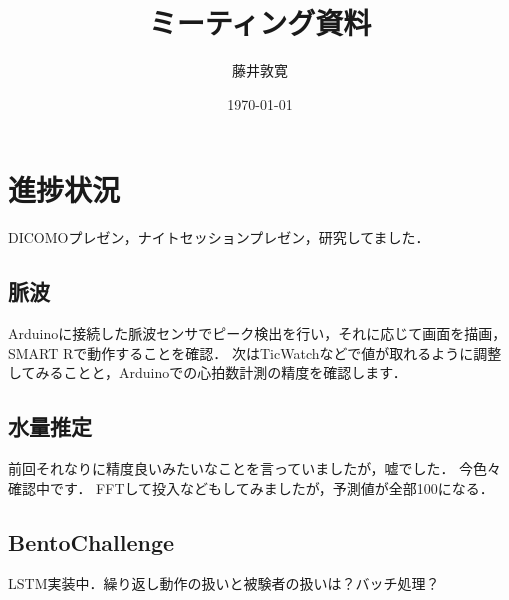 \documentclass[a4j,10pt]{jarticle}
\title{ミーティング資料}
\author{藤井敦寛}
\date{\today}
\begin{document}
\maketitle

\section{進捗状況}
DICOMOプレゼン，ナイトセッションプレゼン，研究してました．

\subsection{脈波}
Arduinoに接続した脈波センサでピーク検出を行い，それに応じて画面を描画，SMART Rで動作することを確認．
次はTicWatchなどで値が取れるように調整してみることと，Arduinoでの心拍数計測の精度を確認します．

\subsection{水量推定}
前回それなりに精度良いみたいなことを言っていましたが，嘘でした．
今色々確認中です．
FFTして投入などもしてみましたが，予測値が全部100になる．

\subsection{BentoChallenge}
LSTM実装中．繰り返し動作の扱いと被験者の扱いは？バッチ処理？




\end{document}

